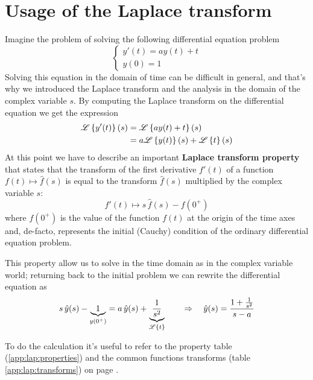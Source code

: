 \section{Usage of the Laplace transform}
	Imagine the problem of solving the following differential equation problem
	\[ \begin{cases}
		y'(t) = ay(t) + t \\ y(0) = 1 
	\end{cases} \]
	Solving this equation in the domain of time can be difficult in general, and that's why we introduced the Laplace transform and the analysis in the domain of the complex variable $s$. By computing the Laplace transform on the differential equation we get the expression
	\begin{align*}
		\mathscr{L} \left\{ y'(t) \right\}(s) & = \mathscr{L} \left\{ a y(t) + t \right\} (s) \\ & = a \mathscr{L} \left\{ y(t) \right\} (s) + \mathscr{L} \left\{ t \right\}(s)
	\end{align*}
	At this point we have to describe an important \textbf{Laplace transform property} that states that the transform of the first derivative $f'(t)$ of a function $f(t) \mapsto \hat f(s)$ is equal to the transform $\hat f(s)$ multiplied by the complex variable $s$:
	\begin{equation}
		f'(t) \mapsto s\, \hat f(s) - f(0^+)
	\end{equation} 
	where $f(0^+)$ is the value of the function $f(t)$ at the origin of the time axes and, de-facto, represents the initial (Cauchy) condition of the ordinary differential equation problem.
	
	This property allow us to solve  in the time domain as  in the complex variable world; returning back to the initial problem we can rewrite the differential equation as
	\[ s \, \hat y(s) - \underbrace{1}_{y(0^+)} = a \, \hat y(s) + \underbrace{\frac 1 {s^2}}_{\mathscr{L} \left\{ t \right\}} \qquad \Rightarrow \quad \hat y(s) = \frac{1 + \frac 1 {s^2}}{s-a} \]
	\begin{note}
		To do the calculation it's useful to refer to the property table (\ref{app:lap:properties}) and the common functions transforms (table \ref{app:lap:transforms}) on page \pageref{app:lap:transforms}.
	\end{note}	
	
